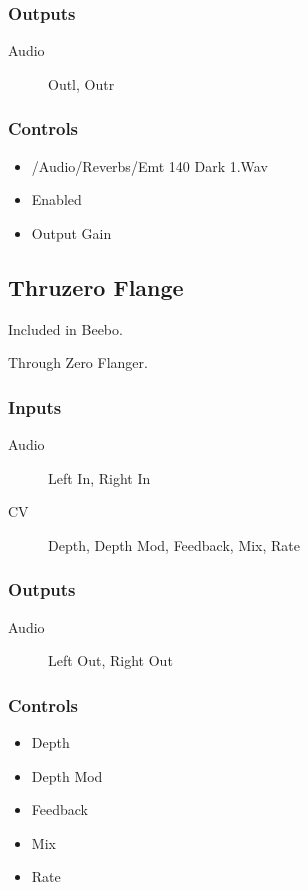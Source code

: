 \subsubsection{Outputs}
\begin{description}
\item [Audio] Outl, Outr
\end{description}

\subsubsection{Controls}
\begin{itemize}
\item /Audio/Reverbs/Emt 140 Dark 1.Wav
\item Enabled
\item Output Gain
\end{itemize}

\subsection{Thruzero Flange}

Included in Beebo.

Through Zero Flanger.



\subsubsection{Inputs}
\begin{description}
\item [Audio] Left In, Right In
\item [CV] Depth, Depth Mod, Feedback, Mix, Rate
\end{description}

\subsubsection{Outputs}
\begin{description}
\item [Audio] Left Out, Right Out
\end{description}

\subsubsection{Controls}
\begin{itemize}
\item Depth
\item Depth Mod
\item Feedback
\item Mix
\item Rate
\end{itemize}

